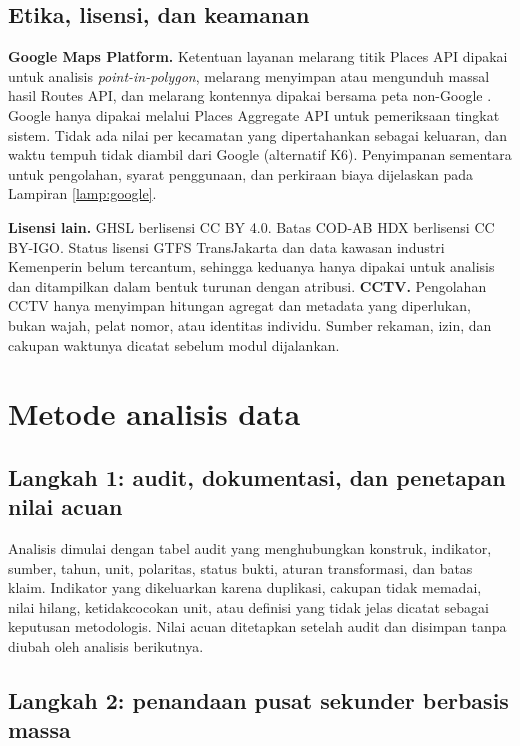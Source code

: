 \documentclass[12pt,a4paper,oneside,openany,indonesian]{report}
\begin{document}
\subsection{Etika, lisensi, dan
keamanan}\label{etika-lisensi-dan-keamanan}

\textbf{Google Maps Platform.} Ketentuan layanan melarang titik Places API dipakai untuk analisis \emph{point-in-polygon}, melarang menyimpan atau mengunduh massal hasil Routes API, dan melarang kontennya dipakai bersama peta non-Google \parencite{googlemaps2026tos,googlemaps2026terms}. Google hanya dipakai melalui Places Aggregate API untuk pemeriksaan tingkat sistem. Tidak ada nilai per kecamatan yang dipertahankan sebagai keluaran, dan waktu tempuh tidak diambil dari Google (alternatif K6). Penyimpanan sementara untuk pengolahan, syarat penggunaan, dan perkiraan biaya dijelaskan pada Lampiran \ref{lamp:google}.

\textbf{Lisensi lain.} GHSL berlisensi CC BY 4.0. Batas COD-AB HDX
berlisensi CC BY-IGO. Status lisensi GTFS TransJakarta dan data kawasan
industri Kemenperin belum tercantum, sehingga keduanya hanya dipakai
untuk analisis dan ditampilkan dalam bentuk turunan dengan atribusi.
\textbf{CCTV.} Pengolahan CCTV hanya menyimpan hitungan agregat dan
metadata yang diperlukan, bukan wajah, pelat nomor, atau identitas
individu. Sumber rekaman, izin, dan cakupan waktunya dicatat sebelum
modul dijalankan.

\section{Metode analisis data}\label{metode-analisis-data}

\subsection{Langkah 1: audit, dokumentasi, dan penetapan nilai
acuan}\label{langkah-1-audit-dokumentasi-dan-pembekuan-garis-dasar}

Analisis dimulai dengan tabel audit yang menghubungkan konstruk,
indikator, sumber, tahun, unit, polaritas, status bukti, aturan
transformasi, dan batas klaim. Indikator yang dikeluarkan karena
duplikasi, cakupan tidak memadai, nilai hilang, ketidakcocokan unit,
atau definisi yang tidak jelas dicatat sebagai keputusan metodologis.
Nilai acuan ditetapkan setelah audit dan disimpan tanpa diubah oleh
analisis berikutnya.

\subsection{Langkah 2: penandaan pusat sekunder berbasis
massa}\label{langkah-2-delineasi-pusat-sekunder-dan-wilayah-tangkapan-fungsional}
\end{document}
